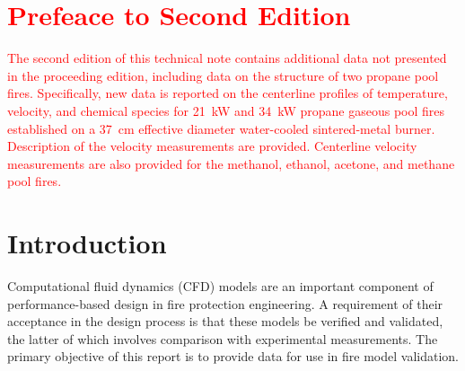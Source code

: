 \documentclass[12pt]{article}
\begin{document}

\begin{multicols}{2}
\printnomenclature
\end{multicols}

\clearpage
\section*{\textcolor{red}{Prefeace to Second Edition}}
\textcolor{red}{The second edition of this technical note contains additional data not presented in the proceeding edition, including data on the structure of two propane pool fires. Specifically, new data is reported on the centerline profiles of temperature, velocity, and chemical species for \textcolor{red}{21~kW} and 34~kW propane gaseous pool fires established on a 37~cm effective diameter water-cooled sintered-metal burner. Description of the velocity measurements are provided. Centerline velocity measurements are also provided for the methanol, ethanol, acetone, and methane pool fires.}

\clearpage

\section{Introduction}
\label{sec:intro}
Computational fluid dynamics (CFD) models are an important component of performance-based design in fire protection engineering. A requirement of their acceptance in the design process is that these models be verified and validated, the latter of which involves comparison with experimental measurements. The primary objective of this report is to provide data for use in fire model validation.
\end{document}

